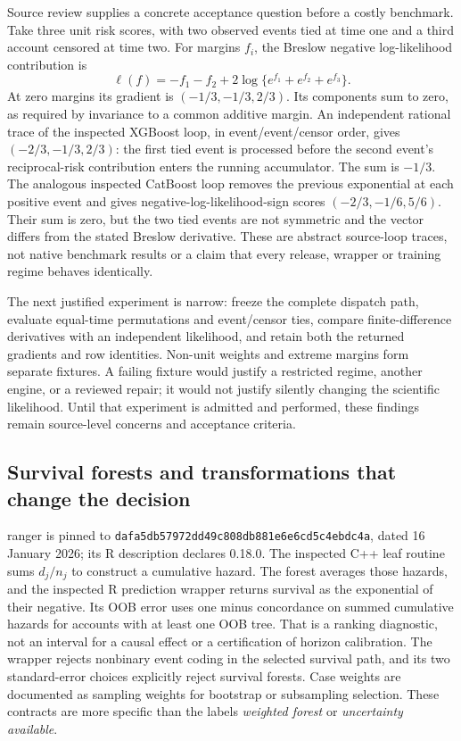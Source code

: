 Source review supplies a concrete acceptance question before a costly benchmark.
Take three unit risk scores, with two observed events tied at time one and a
third account censored at time two. For margins $f_i$, the Breslow negative
log-likelihood contribution is
\[
 \ell(f)=-f_1-f_2+2\log\{e^{f_1}+e^{f_2}+e^{f_3}\}.
\]
At zero margins its gradient is $(-1/3,-1/3,2/3)$. Its components sum to zero,
as required by invariance to a common additive margin. An independent rational
trace of the inspected XGBoost loop, in event/event/censor order, gives
$(-2/3,-1/3,2/3)$: the first tied event is processed before the second event's
reciprocal-risk contribution enters the running accumulator. The sum is
$-1/3$. The analogous inspected CatBoost loop removes the previous exponential
at each positive event and gives negative-log-likelihood-sign scores
$(-2/3,-1/6,5/6)$. Their sum is zero, but the two tied events are not symmetric
and the vector differs from the stated Breslow derivative. These are abstract
source-loop traces, not native benchmark results or a claim that every release,
wrapper or training regime behaves identically.\citep{exec24_longcxx_xgboost,exec24_longcxx_catboost,exec24_longcxx_reference}

The next justified experiment is narrow: freeze the complete dispatch path,
evaluate equal-time permutations and event/censor ties, compare finite-difference
derivatives with an independent likelihood, and retain both the returned
gradients and row identities. Non-unit weights and extreme margins form separate
fixtures. A failing fixture would justify a restricted regime, another engine,
or a reviewed repair; it would not justify silently changing the scientific
likelihood. Until that experiment is admitted and performed, these findings
remain source-level concerns and acceptance criteria.

\subsection{Survival forests and transformations that change the decision}

ranger is pinned to
\texttt{dafa5db57972dd49c808db881e6e6cd5c4ebdc4a}, dated 16 January
2026; its R description declares 0.18.0. The inspected C++ leaf routine sums
$d_j/n_j$ to construct a cumulative hazard. The forest averages those hazards,
and the inspected R prediction wrapper returns survival as the exponential of
their negative. Its OOB error uses one minus concordance on summed cumulative
hazards for accounts with at least one OOB tree. That is a ranking diagnostic,
not an interval for a causal effect or a certification of horizon calibration.
The wrapper rejects nonbinary event coding in the selected survival path, and
its two standard-error choices explicitly reject survival forests. Case weights
are documented as sampling weights for bootstrap or subsampling selection.
These contracts are more specific than the labels \emph{weighted forest} or
\emph{uncertainty available}.\citep{exec24_longcxx_ranger}

